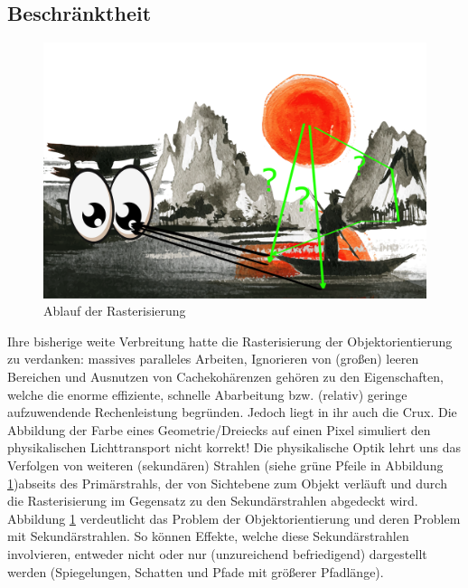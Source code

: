         \subsection{Beschränktheit}
        \label{sec:Rasterisierung:Beschränktheit}
        
        
        \begin{figure}[H]
            \centering
            \includegraphics[width=\linewidth]{content/PathTracer/Bilder/RasterizerGuide.png}
            \caption{Ablauf der Rasterisierung}
            \label{pic:RasterizerGuide}
        \end{figure}

        Ihre bisherige weite Verbreitung hatte die Rasterisierung der Objektorientierung zu verdanken: massives paralleles Arbeiten, Ignorieren von (großen) leeren Bereichen und
        Ausnutzen von Cachekohärenzen gehören zu den Eigenschaften, welche die enorme effiziente, schnelle Abarbeitung bzw. (relativ) geringe aufzuwendende Rechenleistung begründen.
        Jedoch liegt in ihr auch die Crux.
        Die Abbildung der Farbe eines Geometrie/Dreiecks auf einen Pixel simuliert
        den physikalischen Lichttransport nicht korrekt! Die physikalische Optik lehrt uns das Verfolgen von weiteren (sekundären) Strahlen 
        (siehe grüne Pfeile in Abbildung \ref{pic:RasterizerGuide})abseits des Primärstrahls, der von 
        Sichtebene zum Objekt verläuft und durch die Rasterisierung im Gegensatz zu den Sekundärstrahlen abgedeckt wird. Abbildung \ref{pic:RasterizerGuide} verdeutlicht das 
        Problem der Objektorientierung und deren Problem mit Sekundärstrahlen. So können Effekte, welche diese Sekundärstrahlen involvieren, 
        entweder nicht oder nur (unzureichend befriedigend) dargestellt werden (Spiegelungen, Schatten und Pfade mit größerer Pfadlänge). \par

